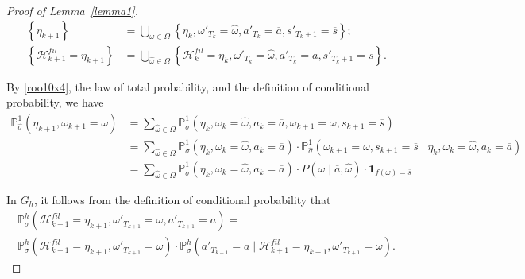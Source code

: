 \documentclass[english,openary,11pt]{article}
\theoremstyle{definition}
\renewcommand{\P}{\mathbb{P}}
\begin{document}
\begin{proof}[Proof of Lemma~\ref{lemma1}]
\begin{equation}
\begin{aligned}
\left\{\eta_{k+1}\right\} &= \bigcup_{\widehat \omega \in \Omega} \left\{\eta_{k}, \omega'_{T_{k}} = \widehat \omega, a'_{T_{k}} = \overline a, s'_{T_{k}+1} = \overline s \right\}; \\
\left\{\mathcal H^{fil}_{k+1} = \eta_{k+1}\right\} &= \bigcup_{\widehat \omega \in \Omega} \left\{\mathcal H^{fil}_{k} = \eta_{k}, \omega'_{T_{k}} = \widehat \omega, a'_{T_{k}} = \overline a, s'_{T_{k}+1} = \overline s \right\}.
\end{aligned}
\label{roo10x4}
\end{equation}


By \eqref{roo10x4}, the law of total probability, and the definition of conditional probability, we have
\begin{equation}
\begin{aligned}
\mathbb{P}_{\widehat{\sigma}}^1(\eta_{k+1}, \omega_{k+1} = \omega) 
&= \sum_{\widehat{\omega} \in \Omega} \mathbb{P}_{\widehat{\sigma}}^1(\eta_k, \omega_k = \widehat{\omega}, a_k = \overline{a}, \omega_{k+1} = \omega, s_{k+1} = \overline{s}) \\
&= \sum_{\widehat{\omega} \in \Omega} \mathbb{P}_{\widehat{\sigma}}^1(\eta_k, \omega_k = \widehat{\omega}, a_k = \overline{a}) \cdot \mathbb{P}_{\widehat{\sigma}}^1(\omega_{k+1} = \omega, s_{k+1} = \overline{s} \mid \eta_k, \omega_k = \widehat{\omega}, a_k = \overline{a}) \\
&= \sum_{\widehat{\omega} \in \Omega} \mathbb{P}_{\widehat{\sigma}}^1(\eta_k, \omega_k = \widehat{\omega}, a_k = \overline{a}) \cdot P(\omega \mid \overline{a}, \widehat{\omega}) \cdot \mathbf{1}_{f(\omega) = \overline{s}}
\end{aligned}
\label{roo10x1}
\end{equation}

In $G_h$, it follows from the definition of conditional probability that
\begin{multline}
\P_{\sigma}^h(\mathcal H^{fil}_{k+1} = \eta_{k+1}, \omega'_{T_{k+1}} = \omega, a'_{T_{k+1}} = a) = \\ \P_{\sigma}^h(\mathcal H^{fil}_{k+1} = \eta_{k+1}, \omega'_{T_{k+1}} = \omega) \cdot \P_{\sigma}^h(a'_{T_{k+1}} = a \mid \mathcal H^{fil}_{k+1} = \eta_{k+1}, \omega'_{T_{k+1}} = \omega).
\label{roo11}
\end{multline}


\end{proof}
\end{document}
